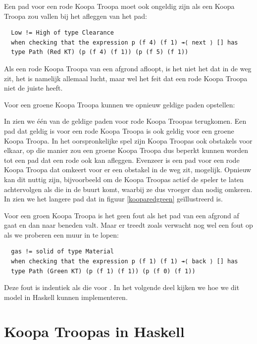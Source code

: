 Een pad voor een rode Koopa Troopa moet ook ongeldig zijn als een Koopa Troopa
zou vallen bij het afleggen van het pad:

\begin{verbatim}
  Low != High of type Clearance
  when checking that the expression p (f 4) (f 1) ↠⟨ next ⟩ [] has
  type Path (Red KT) (p (f 4) (f 1)) (p (f 5) (f 1))
\end{verbatim}

Als een rode Koopa Troopa van een afgrond afloopt, is het niet het
 dat in de weg zit, het is namelijk allemaal lucht, maar wel
het feit dat een rode Koopa Troopa niet de juiste  heeft.

Voor een groene Koopa Troopa kunnen we opnieuw geldige paden opstellen:


In  zien we één van de geldige paden voor rode Koopa
Troopas terugkomen. Een pad dat geldig is voor een rode Koopa Troopa is ook
geldig voor een groene Koopa Troopa. In het oorspronkelijke spel zijn Koopa
Troopas ook obstakels voor elkaar, op die manier zou een groene Koopa Troopa
dus beperkt kunnen worden tot een pad dat een rode ook kan afleggen. Evenzeer
is een pad voor een rode Koopa Troopa dat omkeert voor er een obstakel in de
weg zit, mogelijk. Opnieuw kan dit nuttig zijn, bijvoorbeeld om de Koopa
Troopas actief de speler te laten achtervolgen als die in de buurt komt,
waarbij ze dus vroeger dan nodig omkeren. In  zien we het
langere pad dat in figuur \ref{kooparedgreen} geïllustreerd is.

Voor een groen Koopa Troopa is het geen fout als het pad van een afgrond af
gaat en dan naar beneden valt. Maar er treedt zoals verwacht nog wel een fout
op als we proberen een muur in te lopen:


\begin{verbatim}
  gas != solid of type Material
  when checking that the expression p (f 1) (f 1) ↠⟨ back ⟩ [] has
  type Path (Green KT) (p (f 1) (f 1)) (p (f 0) (f 1))
\end{verbatim}

Deze fout is indentiek als die voor . In het volgende
deel kijken we hoe we dit model in Haskell kunnen implementeren.


\section{Koopa Troopas in Haskell}

